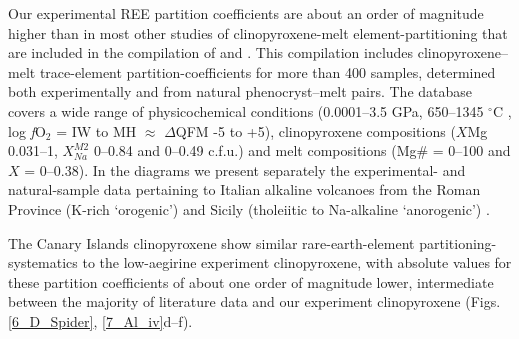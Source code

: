 \documentclass[review,authoryear,12pt]{elsarticle}
\newcommand{\dgC}{$^\circ$C }
\newcommand{\fO}{\textit{f}O$_{2}$ }
\begin{document}
 Our experimental REE partition coefficients are about an order of magnitude higher than in most other studies of clinopyroxene-melt element-partitioning that are included in the compilation of \citet[][Fig. \ref{7_Al_iv}d,e,f]{Bedard2014} and \citep{Mollo2016}. This compilation includes clinopyroxene--melt trace-element partition-coefficients for more than 400 samples, determined both experimentally and from natural phenocryst--melt pairs. The database covers a wide range of physicochemical conditions (0.0001--3.5 GPa, 650--1345 \dgC, log \fO = IW to MH $\approx$ $\Delta$QFM -5 to +5), clinopyroxene compositions ($X$Mg 0.031--1, $X_{Na}^{M2}$ 0--0.84 and  0--0.49 c.f.u.) and melt compositions (Mg\# = 0--100 and $X$ = 0--0.38). In the diagrams we present separately the experimental- and natural-sample data pertaining to Italian alkaline volcanoes from the Roman Province (K-rich `orogenic') and Sicily (tholeiitic to Na-alkaline `anorogenic') \citep[][red transluscent in diagrams]{Wood2001cpx, Fedele2009, Mollo2013, Mollo2016}.



  The Canary Islands clinopyroxene show similar rare-earth-element partitioning-systematics to the low-aegirine experiment clinopyroxene, with absolute values for these partition coefficients of about one order of magnitude lower, intermediate between the majority of literature data and our experiment clinopyroxene (Figs. \ref{6_D_Spider}, \ref{7_Al_iv}d--f). 
\end{document}
